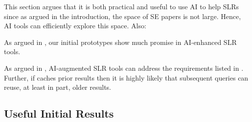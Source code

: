 \noindent
This section argues that it is both practical and useful
to use AI to help SLRs since
as argued in  the introduction,  the space of SE papers is not large. Hence, AI tools can efficiently 
explore this space. Also:
\bi
\item
As argued in , our initial prototypes show much promise in AI-enhanced SLR tools.
\item
As argued in , AI-augmented SLR tools can address the requirements listed in
.
\ei
Further, if {\IT} caches prior results then it is highly likely that subsequent queries can reuse, at least in part,
older results. 
\vspace{8pt}

% 


\subsection{Useful Initial  Results}\label{tion:useful}

